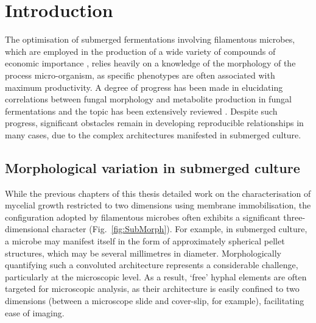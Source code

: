 \section{Introduction}

The optimisation of submerged fermentations involving filamentous microbes, which are employed in the production of a wide variety of compounds of economic importance \cite{archer2001,carlile2001,papagiannireview}, relies heavily on a knowledge of the morphology of the process micro-organism, as specific phenotypes are often associated with maximum productivity. A degree of progress has been made in elucidating correlations between fungal morphology and metabolite production in fungal fermentations and the topic has been extensively reviewed \cite{papagiannireview,wang2005,grimm2005b}. Despite such progress, significant obstacles remain in developing reproducible relationships in many cases, due to the complex architectures manifested in submerged culture.

\subsection{Morphological variation in submerged culture}

While the previous chapters of this thesis detailed work on the characterisation of mycelial growth restricted to two dimensions using membrane immobilisation, the configuration adopted by filamentous microbes often exhibits a significant three-dimensional character (Fig.~\ref{fig:SubMorph}). For example, in submerged culture, a microbe may manifest itself in the form of approximately spherical pellet structures, which may be several millimetres in diameter. Morphologically quantifying such a convoluted architecture represents a considerable challenge, particularly at the microscopic level. As a result, \lq free' hyphal elements are often targeted for microscopic analysis, as their architecture is easily confined to two dimensions (between a microscope slide and cover-slip, for example), facilitating ease of imaging.


